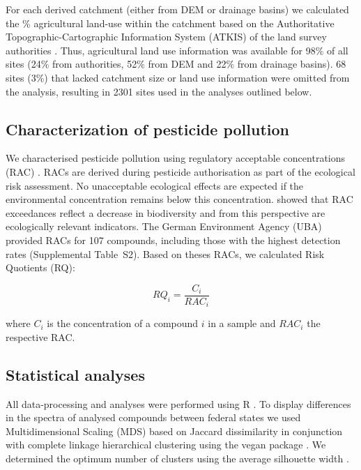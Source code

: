 For each derived catchment (either from DEM or drainage basins) we calculated the \% agricultural land-use within the catchment based on the Authoritative Topographic-Cartographic Information System (ATKIS) of the land survey authorities \citep{adv_atkis_2016}. 
Thus, agricultural land use information was available for 98\% of all sites (24\% from authorities, 52\% from DEM and 22\% from drainage basins). 
68 sites (3\%) that lacked catchment size or land use information were omitted from the analysis, resulting in 2301 sites used in the analyses outlined below.



\subsection{Characterization of pesticide pollution}
We characterised pesticide pollution using regulatory acceptable concentrations (RAC) \citep{brock_linking_2010}.
RACs are derived during pesticide authorisation as part of the ecological risk assessment.
No unacceptable ecological effects are expected if the environmental concentration remains below this concentration.
\citet{stehle_pesticide_2015} showed that RAC exceedances reflect a decrease in biodiversity and from this perspective are ecologically relevant indicators. 
The German Environment Agency (UBA) provided RACs for 107 compounds, including those with the highest detection rates (Supplemental Table~S2). 
Based on theses RACs, we calculated Risk Quotients (RQ):

\begin{equation}
RQ_i = \frac{C_i}{RAC_i}
\end{equation}

where $C_i$ is the concentration of a compound $i$ in a sample and $RAC_i$ the respective RAC.


\subsection{Statistical analyses}
All data-processing and analyses were performed using R \citep{r_core_team_r:_2016}.
To display differences in the spectra of analysed compounds between federal states we used Multidimensional Scaling (MDS) based on Jaccard dissimilarity in conjunction with complete linkage hierarchical clustering using the vegan package \citep{oksanen_vegan:_2016}.
We determined the optimum number of clusters using the average silhouette width \citep{rousseeuw1987silhouettes}. 

